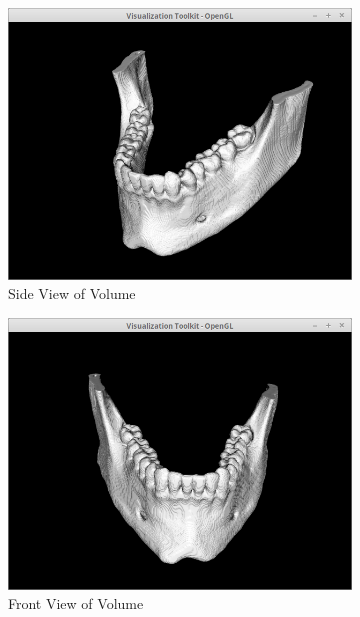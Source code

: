\documentclass[10pt, b5paper]{article}
\begin{document}
\begin{figure}
    \centering
    \begin{subfigure}[b]{0.33\textwidth}
        \centering
        \includegraphics[width=\textwidth]{MCS}
        \caption{Side View of Volume}
    \end{subfigure}
    \hfill
    \begin{subfigure}[b]{0.33\textwidth}
        \centering
        \includegraphics[width=\textwidth]{MCF}
        \caption{Front View of Volume}
    \end{subfigure}
      \hfill
    \begin{subfigure}[b]{0.33\textwidth}

\end{subfigure}
\end{figure}
\end{document}
